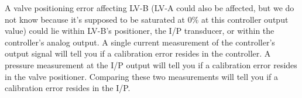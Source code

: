 \vskip 10pt

A valve positioning error affecting LV-B (LV-A could also be affected, but we do not know because it's supposed to be saturated at 0\% at this controller output value) could lie within LV-B's positioner, the I/P transducer, or within the controller's analog output.  A single current measurement of the controller's output signal will tell you if a calibration error resides in the controller.  A pressure measurement at the I/P output will tell you if a calibration error resides in the valve positioner.  Comparing these two measurements will tell you if a calibration error resides in the I/P.



